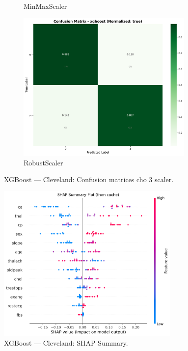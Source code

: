 \begin{figure}[H]
\begin{subfigure}[b]{0.31\textwidth}
\caption{MinMaxScaler}\label{fig:xgb_clev_cm_minmax}
\end{subfigure}\hfill
\begin{subfigure}[b]{0.31\textwidth}\centering
\includegraphics[width=0.95\textwidth]{Result/cleveland_dataset/confusion_matrices/xgboost_numeric_dataset_RobustScaler.png}
\caption{RobustScaler}\label{fig:xgb_clev_cm_robust}
\end{subfigure}
\caption{XGBoost — Cleveland: Confusion matrices cho 3 scaler.}
\label{fig:xgb_clev_confusions}
\end{figure}

\begin{figure}[H]
\centering
\includegraphics[width=0.8\textwidth]{Result/cleveland_dataset/XGBoost/SHAP/Summary.png}
\caption{XGBoost — Cleveland: SHAP Summary.}
\label{fig:xgb_clev_shap_summary}
\end{figure}

